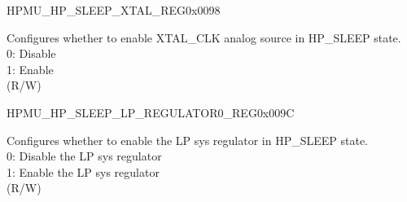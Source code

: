 \begin{register}{H}{PMU\_HP\_SLEEP\_XTAL\_REG}{0x0098}\label{regdesc:PMUHPSLEEPXTALREG}
%
%
\regnewline%
\begin{regdesc}\begin{reglist}
\label{fielddesc:PMUHPSLEEPXPDXTAL}\item [PMU\_HP\_SLEEP\_XPD\_XTAL] Configures whether to enable XTAL\_CLK analog source in HP\_SLEEP state.\\
0: Disable\\
1: Enable\\
(R/W)
\end{reglist}\end{regdesc}
\end{register}

\begin{register}{H}{PMU\_HP\_SLEEP\_LP\_REGULATOR0\_REG}{0x009C}\label{regdesc:PMUHPSLEEPLPREGULATOR0REG}
%
%
%
%
%
\regnewline%
\begin{regdesc}\begin{reglist}
\label{fielddesc:PMUHPSLEEPLPREGULATORXPD}\item [PMU\_HP\_SLEEP\_LP\_REGULATOR\_XPD] Configures whether to enable the LP sys regulator in HP\_SLEEP state.\\
0: Disable the LP sys regulator\\
1: Enable the LP sys regulator\\
(R/W)
\end{reglist}\end{regdesc}
\end{register}

